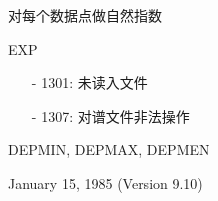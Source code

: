 \label{cmd:exp}

对每个数据点做自然指数

EXP

\begin{itemize}
\item[-]1301: 未读入文件
\item[-]1307: 对谱文件非法操作
\end{itemize}

DEPMIN, DEPMAX, DEPMEN

January 15, 1985 (Version 9.10)
